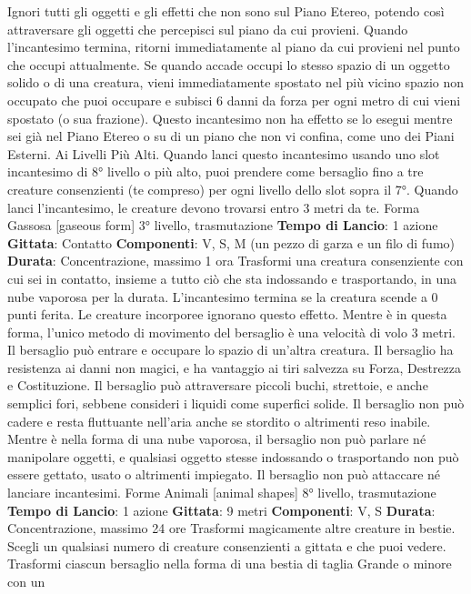 \begin{multicols}{2}
Ignori tutti gli oggetti e gli effetti che non sono sul Piano
Etereo, potendo così attraversare gli oggetti che
percepisci sul piano da cui provieni.
Quando l’incantesimo termina, ritorni immediatamente
al piano da cui provieni nel punto che occupi
attualmente. Se quando accade occupi lo stesso spazio
di un oggetto solido o di una creatura, vieni
immediatamente spostato nel più vicino spazio non
occupato che puoi occupare e subisci 6 danni da forza
per ogni metro di cui vieni spostato (o sua frazione).
Questo incantesimo non ha effetto se lo esegui mentre
sei già nel Piano Etereo o su di un piano che non vi
confina, come uno dei Piani Esterni.
Ai Livelli Più Alti. Quando lanci questo incantesimo
usando uno slot incantesimo di 8° livello o più alto, puoi
prendere come bersaglio fino a tre creature
consenzienti (te compreso) per ogni livello dello slot
sopra il 7°. Quando lanci l’incantesimo, le creature
devono trovarsi entro 3 metri da te.
Forma Gassosa
[gaseous form]
3° livello, trasmutazione
\textbf{Tempo di Lancio}: 1 azione
\textbf{Gittata}: Contatto
\textbf{Componenti}: V, S, M (un pezzo di garza e un filo di
fumo)
\textbf{Durata}: Concentrazione, massimo 1 ora
Trasformi una creatura consenziente con cui sei in
contatto, insieme a tutto ciò che sta indossando e
trasportando, in una nube vaporosa per la durata.
L’incantesimo termina se la creatura scende a 0 punti
ferita. Le creature incorporee ignorano questo effetto.
Mentre è in questa forma, l’unico metodo di movimento
del bersaglio è una velocità di volo 3 metri. Il bersaglio
può entrare e occupare lo spazio di un’altra creatura. Il
bersaglio ha resistenza ai danni non magici, e ha
vantaggio ai tiri salvezza su Forza, Destrezza e
Costituzione. Il bersaglio può attraversare piccoli buchi,
strettoie, e anche semplici fori, sebbene consideri i
liquidi come superfici solide. Il bersaglio non può cadere
e resta fluttuante nell’aria anche se stordito o altrimenti
reso inabile.
Mentre è nella forma di una nube vaporosa, il bersaglio
non può parlare né manipolare oggetti, e qualsiasi
oggetto stesse indossando o trasportando non può
essere gettato, usato o altrimenti impiegato. Il bersaglio
non può attaccare né lanciare incantesimi.
Forme Animali
[animal shapes]
8° livello, trasmutazione
\textbf{Tempo di Lancio}: 1 azione
\textbf{Gittata}: 9 metri
\textbf{Componenti}: V, S
\textbf{Durata}: Concentrazione, massimo 24 ore
Trasformi magicamente altre creature in bestie. Scegli
un qualsiasi numero di creature consenzienti a gittata e
che puoi vedere. Trasformi ciascun bersaglio nella
forma di una bestia di taglia Grande o minore con un

\end{multicols}

